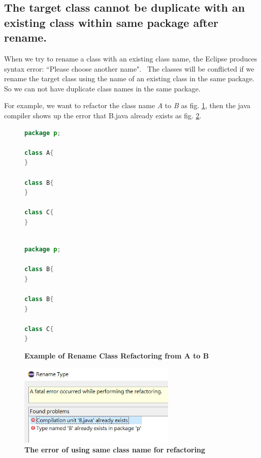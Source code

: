 \subsection{The target class cannot be duplicate with an existing class within same package after rename.}

When we try to rename a class with an existing class name, the Eclipse produces syntax error:
``Please choose another name".~\cite{EclipseWebPage} The classes will be conflicted if we rename the target class using the name of an existing class in the same package. So we can not have duplicate class names in the same package. 

For example, we want to refactor the class name \textsl{A} to \textsl{B} as fig. \ref{fig:afterrr}, then the java compiler shows up the error that B.java already exists as fig. \ref{fig:renameclassname}.

\begin{figure}[th]
\centering
\begin{minipage}[t]{0.45\linewidth}
\begin{lstlisting}[language=java, basicstyle=\scriptsize\ttfamily,frame=single]
package p;

class A{
}
	
class B{
}

class C{
}
 
\end{lstlisting}
\end{minipage}
\hfill
\begin{minipage}[t]{0.45\linewidth}
\begin{lstlisting}[language=java, basicstyle=\scriptsize\ttfamily,frame=single]
package p;

class B{
}	

class B{
}

class C{
}

\end{lstlisting}
\end{minipage}
\caption{\textbf{Example of Rename Class Refactoring from A to B}}
\label{fig:afterrr}
\end{figure}

\begin{figure}[H]
\centerline{\includegraphics[width=75mm,scale=0.4]{SCN.jpg}}
\caption{\textbf{The error of using same class name for refactoring}}
\label{fig:renameclassname}
\end{figure}


